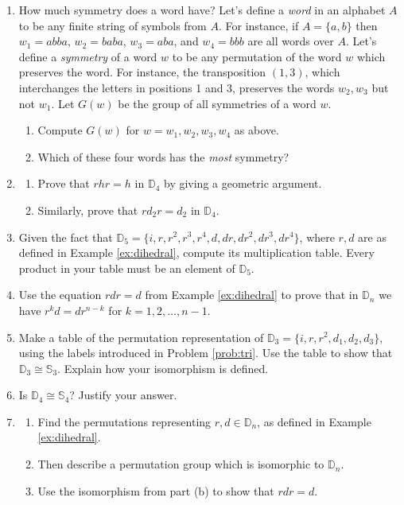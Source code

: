 \documentclass[11pt]{article}
\newenvironment{problems}
{\begin{enumerate}[topsep=1pt,itemsep=0pt,parsep=2pt,leftmargin=0.6cm,%
 label={\arabic*.}, ref=\arabic*]\small%
}
{
 \end{enumerate}
}
\theoremstyle{definition}
\newcommand{\Sym}{\mathbb{S}}
\newcommand{\D}{\mathbb{D}}
\begin{document}
\begin{problems}
\item How much symmetry does a word have? Let's define a \emph{word}
  in an alphabet $A$ to be any finite string of symbols from $A$. For
  instance, if $A = \{a,b\}$ then $w_1=abba$, $w_2=baba$, $w_3=aba$,
  and $w_4 = bbb$ are all words over $A$. Let's define a
  \emph{symmetry} of a word $w$ to be any permutation of the word $w$
  which preserves the word. For instance, the transposition $(1,3)$,
  which interchanges the letters in positions 1 and 3, preserves the
  words $w_2, w_3$ but not $w_1$. Let $G(w)$ be the group of all
  symmetries of a word $w$.
  \begin{enumerate}
  \item Compute $G(w)$ for $w = w_1, w_2, w_3, w_4$ as above.
  \item Which of these four words has the \emph{most} symmetry?
  \end{enumerate}

  

\item 
  \begin{enumerate}
  \item Prove that $rhr = h$ in $\D_4$ by giving a geometric argument.
  \item Similarly, prove that $rd_2r = d_2$ in $\D_4$.
  \end{enumerate}

\item Given the fact that
  $\D_5 = \{ i,r,r^2,r^3,r^4, d, dr, dr^2, dr^3, dr^4 \}$, where $r,d$
  are as defined in Example \ref{ex:dihedral}, compute its
  multiplication table. Every product in your table must be an element
  of $\D_5$.

\item Use the equation $rdr = d$ from Example \ref{ex:dihedral} to
  prove that in $\D_n$ we have $r^kd = d r^{n-k}$ for $k = 1, 2, \dots,
  n-1$. 


\item Make a table of the permutation representation of
  $\D_3 = \{i, r, r^2, d_1, d_2, d_3\}$, using the labels introduced
  in Problem \ref{prob:tri}. Use the table to show that
  $\D_3 \cong \Sym_3$. Explain how your isomorphism is defined.
  
\item Is $\D_4 \cong \Sym_4$? Justify your answer.


\item 
  \begin{enumerate}
  \item Find the permutations representing $r,d \in \D_n$, as defined
    in Example \ref{ex:dihedral}.
  \item Then describe a permutation group which is isomorphic to
    $\D_n$.
  \item Use the isomorphism from part (b) to show that $rdr = d$.
  \end{enumerate}

\end{problems}
\end{document}
